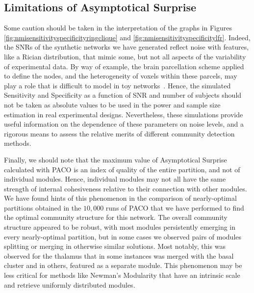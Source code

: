 \subsection{Limitations of Asymptotical Surprise}
Some caution should be taken in the interpretation of the graphs in Figures \ref{fig:nmisensitivityspecificityringclique} and \ref{fig:nmisensitivityspecificitylfr}.
Indeed, the SNRs of the synthetic networks we have generated reflect noise with features, like a Rician distribution, that mimic some, but not all aspects of the variability of experimental data.
By way of example, the brain parcellation scheme applied to define the nodes, and the heterogeneity of voxels within these parcels, may play a role that is difficult to model in toy networks~\cite{fornito2010}.
Hence, the simulated Sensitivity and Specificity as a function of SNR and number of subjects should not be taken as absolute values to be used in the power and sample size estimation in real experimental designs.
Nevertheless, these simulations provide useful information on the dependence of these parameters on noise levels, and a rigorous means to assess the relative merits of different community detection methods.

Finally, we should note that the maximum value of Asymptotical Surprise calculated with PACO is an index of quality of the entire partition, and not of individual modules.
Hence, individual modules may not all have the same strength of internal cohesiveness relative to their connection with other modules.
We have found hints of this phenomenon in the comparison of nearly-optimal partitions obtained in the $10,000$ runs of PACO that we have performed to find the optimal community structure for this network.
The overall community structure appeared to be robust, with most modules persistently emerging in every nearly-optimal partition, but in some cases we observed pairs of modules splitting or merging in otherwise similar solutions. Most notably, this was observed for the thalamus that in some instances was merged with the basal cluster and in others, featured as a separate module.
This phenomenon may be less critical for methods like Newman's Modularity that have an intrinsic scale and retrieve uniformly distributed modules.

